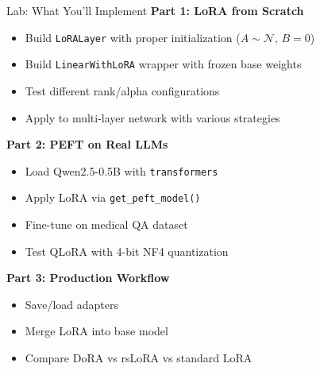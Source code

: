 \documentclass[aspectratio=169,10pt]{beamer}
\begin{document}
\begin{frame}[fragile]{Lab: What You'll Implement}
	\textbf{Part 1: LoRA from Scratch}
	\begin{itemize}
		\item Build \texttt{LoRALayer} with proper initialization ($A \sim \mathcal{N}$, $B = 0$)
		\item Build \texttt{LinearWithLoRA} wrapper with frozen base weights
		\item Test different rank/alpha configurations
		\item Apply to multi-layer network with various strategies
	\end{itemize}

	\vspace{0.2cm}
	\textbf{Part 2: PEFT on Real LLMs}
	\begin{itemize}
		\item Load Qwen2.5-0.5B with \texttt{transformers}
		\item Apply LoRA via \texttt{get\_peft\_model()}
		\item Fine-tune on medical QA dataset
		\item Test QLoRA with 4-bit NF4 quantization
	\end{itemize}

	\vspace{0.2cm}
	\textbf{Part 3: Production Workflow}
	\begin{itemize}
		\item Save/load adapters
		\item Merge LoRA into base model
		\item Compare DoRA vs rsLoRA vs standard LoRA
	\end{itemize}
\end{frame}
\end{document}
